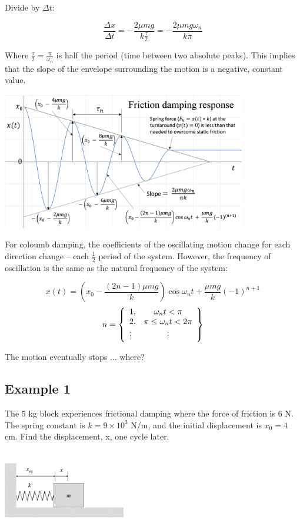 \documentclass[12pt,letterpaper,twoside]{report}
\begin{document}
Divide by $\Delta t$:

\[ \frac{\Delta x}{\Delta t} = - \frac{2 \mu mg}{k \frac{\tau}{2}} =  - \frac{2 \mu mg \omega_n}{k \pi} \]

Where $\frac{\tau}{2} = \frac{\pi}{\omega_n}$ is half the period (time between two absolute peaks). This implies that the slope of the envelope surrounding the motion is a negative, constant value.

\includegraphics[trim={0cm 0cm 0cm 0cm},clip,width=0.8\textwidth, center]{Slide97}

For coloumb damping, the coefficients of the oscillating motion change for each direction change – each $\frac{1}{2}$ period of the system. However, the frequency of oscillation is the same as the natural frequency of the system:

\[
x(t) = \left( x_0 - \frac{(2n-1) \mu mg}{k} \right) \cos \omega_n t + \frac{\mu mg}{k} \left( -1 \right) ^{n+1}
\]
\[  
n= \left\{
\begin{array}{l c}
1, & \omega_n t < \pi \\
2, & \pi \leq \omega_n t < 2 \pi\\
\vdots & \vdots \\
\end{array} \right\}
\]

The motion eventually stops ... where?

\newpage

\subsection{Example 1}
The $5$ kg  block experiences frictional damping where the force of friction is $6$ N.  The spring constant is $k = 9 \times 10^3$ N/m, and the initial displacement is $x_0 = 4$ cm.  Find the displacement, x, one cycle later.  

\includegraphics[trim={1cm 1cm 6cm 3cm},clip,width=0.4\textwidth, left]{Slide95}
\end{document}
